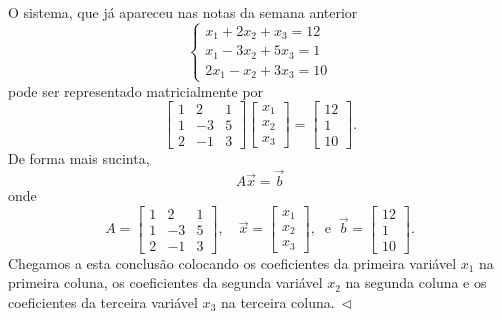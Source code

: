 \begin{ex}\label{example1}
O sistema, que já apareceu nas notas da semana anterior
\begin{equation}
\left\{
  \begin{array}{ll}
    x_1 + 2x_2 + x_3 = 12 \\
    x_1 -3x_2 + 5x_3 = 1 \\
    2x_1 - x_2 + 3x_3 = 10
  \end{array}
\right.
\end{equation} pode ser representado matricialmente por
\begin{equation}
\left[
  \begin{array}{ccc}
    1 &  2 & 1  \\
    1 & -3 & 5  \\
    2 & -1 & 3
  \end{array}
\right]
\left[
  \begin{array}{c}
    x_1   \\
    x_2  \\
    x_3
  \end{array}
\right] =
\left[
  \begin{array}{c}
    12   \\
    1  \\
    10
  \end{array}
\right].
\end{equation} De forma mais sucinta,
\begin{equation}
\boxed{A \vec{x} = \vec{b}}
\end{equation} onde
\begin{equation}
A = \left[
  \begin{array}{ccc}
    1 &  2 & 1  \\
    1 & -3 & 5  \\
    2 & -1 & 3  
  \end{array}
\right], \quad
\vec{x} = \left[
  \begin{array}{c}
    x_1   \\
    x_2  \\
    x_3
  \end{array}
\right], \ \text{ e } \
\vec{b} = \left[
  \begin{array}{c}
    12   \\
    1  \\
    10
  \end{array}
\right].
\end{equation} Chegamos a esta conclusão colocando os coeficientes da primeira variável $x_1$ na primeira coluna, os coeficientes da segunda variável $x_2$ na segunda coluna e os coeficientes da terceira variável $x_3$ na terceira coluna$. \ \lhd$
\end{ex}


